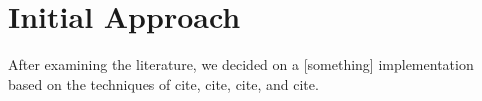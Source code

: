 \documentclass[11pt, a4paper, twocolumn]{article}
\begin{document}
\section{Initial Approach}

After examining the literature, we decided on a [something] implementation based on the techniques of cite, cite, cite, and cite.





\end{document}
